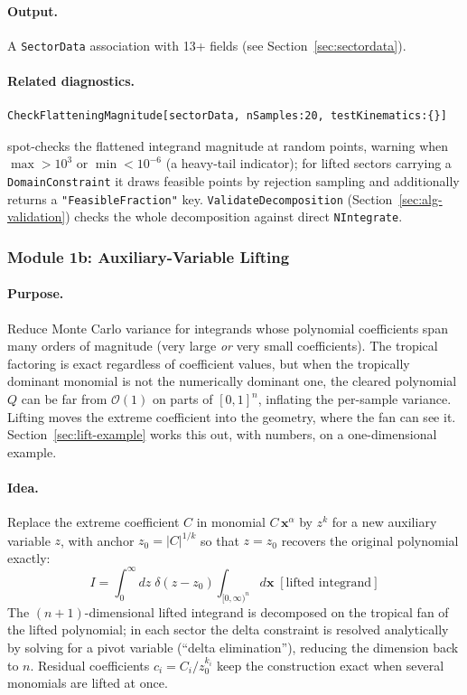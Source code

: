 \documentclass[11pt,a4paper]{article}
\begin{document}
\paragraph{Output.} A \texttt{SectorData} association with 13+ fields (see Section~\ref{sec:sectordata}).

\paragraph{Related diagnostics.}
\begin{lstlisting}
CheckFlatteningMagnitude[sectorData, nSamples:20, testKinematics:{}]
\end{lstlisting}
spot-checks the flattened integrand magnitude at random points, warning when $\max > 10^3$ or $\min < 10^{-6}$ (a heavy-tail indicator); for lifted sectors carrying a \texttt{DomainConstraint} it draws feasible points by rejection sampling and additionally returns a \texttt{"FeasibleFraction"} key. \texttt{ValidateDecomposition} (Section~\ref{sec:alg-validation}) checks the whole decomposition against direct \texttt{NIntegrate}.

\subsubsection{Module 1b: Auxiliary-Variable Lifting}\label{sec:lifting}

\paragraph{Purpose.} Reduce Monte Carlo variance for integrands whose polynomial coefficients span many orders of magnitude (very large \emph{or} very small coefficients). The tropical factoring is exact regardless of coefficient values, but when the tropically dominant monomial is not the numerically dominant one, the cleared polynomial $Q$ can be far from $\mathcal{O}(1)$ on parts of $[0,1]^n$, inflating the per-sample variance. Lifting moves the extreme coefficient into the geometry, where the fan can see it. Section~\ref{sec:lift-example} works this out, with numbers, on a one-dimensional example.

\paragraph{Idea.} Replace the extreme coefficient $C$ in monomial $C\,\mathbf{x}^\alpha$ by $z^k$ for a new auxiliary variable $z$, with anchor $z_0 = |C|^{1/k}$ so that $z = z_0$ recovers the original polynomial exactly:
\begin{equation}
I = \int_0^\infty dz\; \delta(z - z_0) \int_{[0,\infty)^n} d\mathbf{x}\; [\text{lifted integrand}]
\end{equation}
The $(n{+}1)$-dimensional lifted integrand is decomposed on the tropical fan of the lifted polynomial; in each sector the delta constraint is resolved analytically by solving for a pivot variable (``delta elimination''), reducing the dimension back to $n$. Residual coefficients $c_i = C_i / z_0^{k_i}$ keep the construction exact when several monomials are lifted at once.
\end{document}

